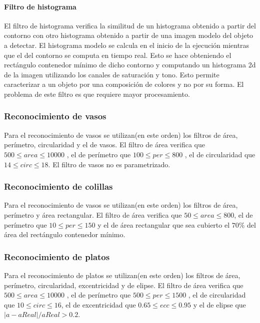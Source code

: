 	\paragraph{Filtro de histograma}
	El filtro de histograma verifica la similitud de un histograma obtenido a partir del contorno con otro histograma obtenido a partir de 
	una imagen modelo del objeto a detectar. El histograma modelo se calcula en el inicio de la ejecución mientras que el del contorno se
	computa en tiempo real. Esto se hace obteniendo el rectángulo contenedor mínimo de dicho contorno y computando un histograma 2d de la imagen
	utilizando los canales de saturación y tono. Esto permite caracterizar a un objeto por una composición de colores y no por su forma. El 
	problema de este filtro es que requiere mayor procesamiento.
	
	\subsubsection{Reconocimiento de vasos}
	Para el reconocimiento de vasos se utilizan(en este orden) los filtros de área, perímetro, circularidad y el de vasos.
	El filtro de área verifica que $500 \leq area \leq 10000 $ , el de perímetro que $100 \leq per \leq 800 $ , el de circularidad
	que $14 \leq circ \leq 18$. El filtro de vasos no es parametrizado. 
	
	\subsubsection{Reconocimiento de colillas}
	Para el reconocimiento de vasos se utilizan(en este orden) los filtros de área, perímetro y área rectangular.
	El filtro de área verifica que $50 \leq area \leq 800 $, el de perímetro que $10 \leq per \leq 150 $ y el de área rectangular
	que sea cubierto el $70\%$ del área del rectángulo contenedor mínimo.
	
	\subsubsection{Reconocimiento de platos}
	Para el reconocimiento de platos se utilizan(en este orden) los filtros de área, perímetro, circularidad, excentricidad y de elipse.
	El filtro de área verifica que $500 \leq area \leq 10000 $ , el de perímetro que $500 \leq per \leq 1500 $ , el de circularidad
	que $10 \leq circ \leq 16$, el de excentricidad que $0.65 \leq ecc \leq 0.95$ y  el de elipse que $|a-aReal|/ aReal > 0.2$.


